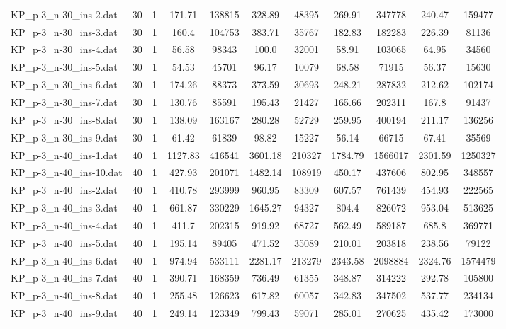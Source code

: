 \begin{table}[!ht]
\begin{tabular}{lcccccccccc}
KP\_p-3\_n-30\_ins-2.dat & 30 & 1 & 171.71 & 138815 & 328.89 & 48395 & 269.91 & 347778 & 240.47 & 159477 \\
KP\_p-3\_n-30\_ins-3.dat & 30 & 1 & 160.4 & 104753 & 383.71 & 35767 & 182.83 & 182283 & 226.39 & 81136 \\
KP\_p-3\_n-30\_ins-4.dat & 30 & 1 & 56.58 & 98343 & 100.0 & 32001 & 58.91 & 103065 & 64.95 & 34560 \\
KP\_p-3\_n-30\_ins-5.dat & 30 & 1 & 54.53 & 45701 & 96.17 & 10079 & 68.58 & 71915 & 56.37 & 15630 \\
KP\_p-3\_n-30\_ins-6.dat & 30 & 1 & 174.26 & 88373 & 373.59 & 30693 & 248.21 & 287832 & 212.62 & 102174 \\
KP\_p-3\_n-30\_ins-7.dat & 30 & 1 & 130.76 & 85591 & 195.43 & 21427 & 165.66 & 202311 & 167.8 & 91437 \\
KP\_p-3\_n-30\_ins-8.dat & 30 & 1 & 138.09 & 163167 & 280.28 & 52729 & 259.95 & 400194 & 211.17 & 136256 \\
KP\_p-3\_n-30\_ins-9.dat & 30 & 1 & 61.42 & 61839 & 98.82 & 15227 & 56.14 & 66715 & 67.41 & 35569 \\
KP\_p-3\_n-40\_ins-1.dat & 40 & 1 & 1127.83 & 416541 & 3601.18 & 210327 & 1784.79 & 1566017 & 2301.59 & 1250327 \\
KP\_p-3\_n-40\_ins-10.dat & 40 & 1 & 427.93 & 201071 & 1482.14 & 108919 & 450.17 & 437606 & 802.95 & 348557 \\
KP\_p-3\_n-40\_ins-2.dat & 40 & 1 & 410.78 & 293999 & 960.95 & 83309 & 607.57 & 761439 & 454.93 & 222565 \\
KP\_p-3\_n-40\_ins-3.dat & 40 & 1 & 661.87 & 330229 & 1645.27 & 94327 & 804.4 & 826072 & 953.04 & 513625 \\
KP\_p-3\_n-40\_ins-4.dat & 40 & 1 & 411.7 & 202315 & 919.92 & 68727 & 562.49 & 589187 & 685.8 & 369771 \\
KP\_p-3\_n-40\_ins-5.dat & 40 & 1 & 195.14 & 89405 & 471.52 & 35089 & 210.01 & 203818 & 238.56 & 79122 \\
KP\_p-3\_n-40\_ins-6.dat & 40 & 1 & 974.94 & 533111 & 2281.17 & 213279 & 2343.58 & 2098884 & 2324.76 & 1574479 \\
KP\_p-3\_n-40\_ins-7.dat & 40 & 1 & 390.71 & 168359 & 736.49 & 61355 & 348.87 & 314222 & 292.78 & 105800 \\
KP\_p-3\_n-40\_ins-8.dat & 40 & 1 & 255.48 & 126623 & 617.82 & 60057 & 342.83 & 347502 & 537.77 & 234134 \\
KP\_p-3\_n-40\_ins-9.dat & 40 & 1 & 249.14 & 123349 & 799.43 & 59071 & 285.01 & 270625 & 435.42 & 173000 \\

\end{tabular}
\end{table}
